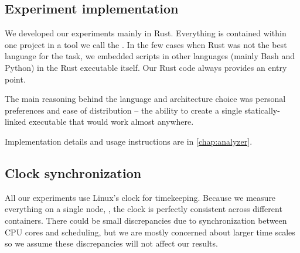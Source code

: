 \subsection{Experiment implementation}

We developed our experiments mainly in Rust. Everything is contained within one project in a tool we call the . In the few cases when Rust was not the best language for the task, we embedded scripts in other languages (mainly Bash and Python) in the Rust executable itself. Our Rust code always provides an entry point.

The main reasoning behind the language and architecture choice was personal preferences and ease of distribution -- the ability to create a single statically-linked executable that would work almost anywhere.

Implementation details and usage instructions are in \cref{chap:analyzer}.

\subsection{Clock synchronization}
\label{subsec:clock}

All our experiments use Linux's  clock for timekeeping. Because we measure everything on a single node, , the clock is perfectly consistent across different containers. There could be small discrepancies due to synchronization between CPU cores and scheduling, but we are mostly concerned about larger time scales so we assume these discrepancies will not affect our results.

